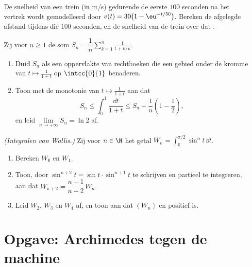 \begin{exercise}[$\star\star$]\label{exo:g12:integ:7}
De snelheid van een trein (in m/s) gedurende de eerste $100$ seconden na het
vertrek wordt gemodelleerd door $v(t) = 30\bigl(1 - \eu^{-t/50}\bigr)$.
Bereken de afgelegde afstand tijdens die $100$ seconden, en de 
snelheid van de trein over dat .
\end{exercise}

\begin{exercise}[$\star\star\star$]\label{exo:g12:integ:8}
Zij voor $n \geq 1$ de som
$S_n = \dfrac1n \displaystyle\sum_{k=1}^{n} \frac{1}{1 + k/n}$.
\begin{enumerate}
  \item Duid $S_n$ als een oppervlakte van rechthoeken die een gebied onder
        de kromme van $t \mapsto \frac{1}{1+t}$ op $\intcc{0}{1}$ benaderen.
  \item Toon met de monotonie van $t \mapsto \frac{1}{1+t}$ aan dat
        \[
        S_n \leq \int_0^1 \frac{\dd t}{1+t} \leq S_n + \frac1n\left(1 - \frac12\right),
        \]
        en leid $\lim\limits_{n\to+\infty} S_n = \ln 2$ af.
\end{enumerate}
\end{exercise}

\begin{exercise}[$\star\star\star$]\label{exo:g12:integ:9}
\emph{(Integralen van Wallis.)} Zij voor $n \in \N$ het getal
$W_n = \displaystyle\int_0^{\pi/2} \sin^n t\,\dd t$.
\begin{enumerate}
  \item Bereken $W_0$ en $W_1$.
  \item Toon, door $\sin^{n+2}t = \sin t \cdot \sin^{n+1} t$ te schrijven en
        partieel te integreren, aan dat $W_{n+2} = \dfrac{n+1}{n+2}\,W_n$.
  \item Leid $W_2$, $W_3$ en $W_4$ af, en toon aan dat $(W_n)$  en
        positief is.
\end{enumerate}
\end{exercise}

\section{Opgave: Archimedes tegen de machine}

